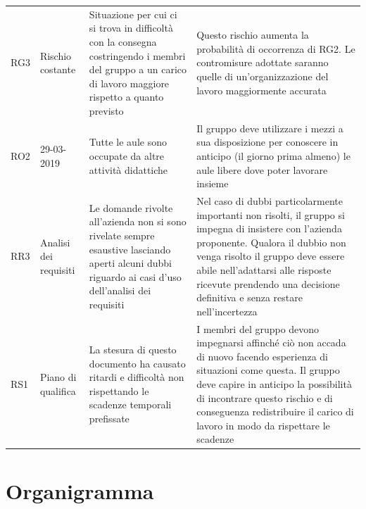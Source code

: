 \begin{center}
\begin{longtable}{ p{} p{} p{} p{}}
    RG3 & Rischio costante & Situazione per cui ci si trova in difficoltà con la consegna costringendo i membri del gruppo a un carico di lavoro maggiore rispetto a quanto previsto & Questo rischio aumenta la probabilità di occorrenza di RG2. Le contromisure adottate saranno quelle di un'organizzazione del lavoro maggiormente accurata \\
    
    RO2 & 29-03-2019 & Tutte le aule sono occupate da altre attività didattiche & Il gruppo deve utilizzare i mezzi a sua disposizione per conoscere in anticipo (il giorno prima almeno) le aule libere dove poter lavorare insieme \\
    
    RR3 & Analisi dei requisiti & Le domande rivolte all'azienda \proposerName{} non si sono rivelate sempre esaustive lasciando aperti alcuni dubbi riguardo ai casi d'uso dell'analisi dei requisiti & Nel caso di dubbi particolarmente importanti non risolti, il gruppo si impegna di insistere con l'azienda proponente. Qualora il dubbio non venga risolto il gruppo deve essere abile nell'adattarsi alle risposte ricevute prendendo una decisione definitiva e senza restare nell'incertezza \\
    
    RS1 & Piano di qualifica & La stesura di questo documento ha causato ritardi e difficoltà non rispettando le scadenze temporali prefissate & I membri del gruppo devono impegnarsi affinché ciò non accada di nuovo facendo esperienza di situazioni come questa. Il gruppo deve capire in anticipo la possibilità di incontrare questo rischio e di conseguenza redistribuire il carico di lavoro in modo da rispettare le scadenze\\
    
    
    \end{longtable}
    
    \end{center}

    
    \section{Organigramma}
